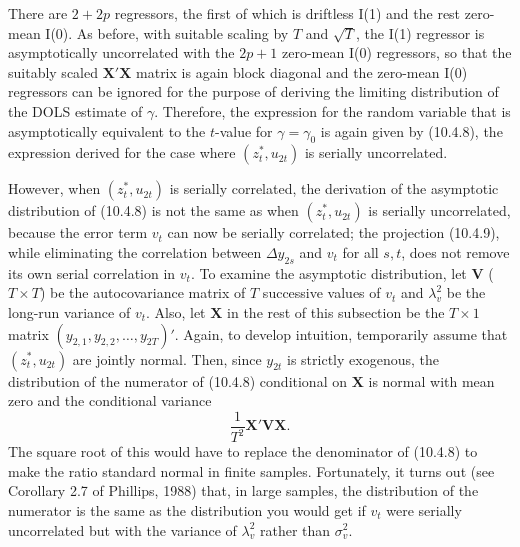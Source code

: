 There are $2 + 2p$ regressors, the first of which is driftless I(1) and the rest
zero-mean I(0). As before, with suitable scaling by $T$ and $\sqrt{T}$, the I(1) regressor
is asymptotically uncorrelated with the $2p + 1$ zero-mean I(0) regressors, so that
the suitably scaled $\mathbf{X}'\mathbf{X}$ matrix is again block diagonal and the zero-mean I(0)
regressors can be ignored for the purpose of deriving the limiting distribution of
the DOLS estimate of $\gamma$. Therefore, the expression for the random variable that is
asymptotically equivalent to the $t$-value for $\gamma = \gamma_0$ is again given by (10.4.8), the
expression derived for the case where $(z_t^*, u_{2t})$ is serially uncorrelated.

However, when $(z_t^*, u_{2t})$ is serially correlated, the derivation of the asymp\-totic
distribution of (10.4.8) is not the same as when $(z_t^*, u_{2t})$ is serially uncorre\-lated,
because the error term $v_t$ can now be serially correlated; the projection
(10.4.9), while eliminating the correlation between $\Delta y_{2s}$ and $v_t$ for all $s, t$, does
not remove its own serial correlation in $v_t$. To examine the asymptotic distribution,
let $\mathbf{V}$ ($T \times T$) be the autocovariance matrix of $T$ successive values of $v_t$ and
$\lambda_v^2$ be
the long-run variance of $v_t$. Also, let $\mathbf{X}$ in the rest of this subsection be the $T \times 1$
matrix $(y_{2,1}, y_{2,2}, \ldots, y_{2T})'$. Again, to develop intuition, temporarily assume that
$(z_t^*, u_{2t})$ are jointly normal. Then, since $y_{2t}$ is strictly exogenous, the distribution
of the numerator of (10.4.8) conditional on $\mathbf{X}$ is normal with mean zero and the
conditional variance
\begin{equation}
  \frac{1}{T^2} \mathbf{X}'\mathbf{V}\mathbf{X}.
  \label{eq:10.4.12} \tag{10.4.12}
\end{equation}
The square root of this would have to replace the denominator of (10.4.8) to make
the ratio standard normal in finite samples. Fortunately, it turns out (see Corollary
2.7 of Phillips, 1988) that, in large samples, the distribution of the numerator is the
same as the distribution you would get if $v_t$ were serially uncorrelated but with the
variance of $\lambda_v^2$ rather than $\sigma_v^2$.

